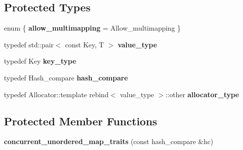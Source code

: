 \subsection*{Protected Types}
\begin{DoxyCompactItemize}
\item 
\hypertarget{classtbb_1_1interface5_1_1concurrent__unordered__map__traits_a183861b7faeba59c07aecbb6517a5e6c}{}enum \{ {\bfseries allow\+\_\+multimapping} = Allow\+\_\+multimapping
 \}\label{classtbb_1_1interface5_1_1concurrent__unordered__map__traits_a183861b7faeba59c07aecbb6517a5e6c}

\item 
\hypertarget{classtbb_1_1interface5_1_1concurrent__unordered__map__traits_a0c77b12f17473e24cda4b60b38e847fd}{}typedef std\+::pair$<$ const Key, T $>$ {\bfseries value\+\_\+type}\label{classtbb_1_1interface5_1_1concurrent__unordered__map__traits_a0c77b12f17473e24cda4b60b38e847fd}

\item 
\hypertarget{classtbb_1_1interface5_1_1concurrent__unordered__map__traits_a133cf0868239271387488f6067ce56ee}{}typedef Key {\bfseries key\+\_\+type}\label{classtbb_1_1interface5_1_1concurrent__unordered__map__traits_a133cf0868239271387488f6067ce56ee}

\item 
\hypertarget{classtbb_1_1interface5_1_1concurrent__unordered__map__traits_afdf65dc261abb44bd733ebab0f54f01b}{}typedef Hash\+\_\+compare {\bfseries hash\+\_\+compare}\label{classtbb_1_1interface5_1_1concurrent__unordered__map__traits_afdf65dc261abb44bd733ebab0f54f01b}

\item 
\hypertarget{classtbb_1_1interface5_1_1concurrent__unordered__map__traits_a5f015ac2f9770d8cd69d0656447b66ac}{}typedef Allocator\+::template rebind$<$ value\+\_\+type $>$\+::other {\bfseries allocator\+\_\+type}\label{classtbb_1_1interface5_1_1concurrent__unordered__map__traits_a5f015ac2f9770d8cd69d0656447b66ac}

\end{DoxyCompactItemize}
\subsection*{Protected Member Functions}
\begin{DoxyCompactItemize}
\item 
\hypertarget{classtbb_1_1interface5_1_1concurrent__unordered__map__traits_ae9e1e3147bd444fb77c544ef7ecb5bef}{}{\bfseries concurrent\+\_\+unordered\+\_\+map\+\_\+traits} (const hash\+\_\+compare \&hc)\label{classtbb_1_1interface5_1_1concurrent__unordered__map__traits_ae9e1e3147bd444fb77c544ef7ecb5bef}

\end{DoxyCompactItemize}
